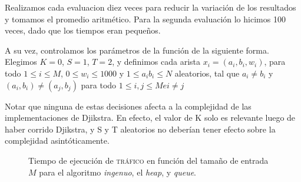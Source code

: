 Realizamos cada evaluacion diez veces para reducir la variación de los resultados y tomamos el promedio aritmético. Para la segunda evaluación lo hicimos 100 veces, dado que los tiempos eran pequeños.

A su vez, controlamos los parámetros de la función de la siguiente forma. Elegimos $K = 0$, $S = 1$, $T = 2$, y definimos cada arista $x_i = (a_i, b_i, w_i)$, para todo $1 \leq  i \leq M$, $0 \leq w_i \leq 1000$ y $1 \leq a_i b_i \leq N$ aleatorios, tal que $a_i \neq b_i$ y $(a_i, b_i) \neq (a_j, b_j)$ para todo $1 \leq i, j \leq M e i \neq j$

Notar que ninguna de estas decisiones afecta a la complejidad de las implementaciones de Djikstra. En efecto, el valor de K solo es relevante luego de haber corrido Djikstra, y S y T aleatorios no deberían tener efecto sobre la complejidad asintóticamente.

\begin{figure}[!htbp]

    \caption{Tiempo de ejecución de \textsc{tráfico} en función del tamaño de entrada $M$ para el algoritmo \textit{ingenuo}, el \textit{heap}, y \textit{queue}.}
    \label{grafico_1}
\end{figure}

